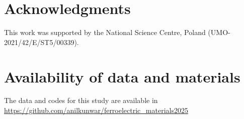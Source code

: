\documentclass[a4paper,fleqn]{cas-sc}
\begin{document}
\section*{Acknowledgments}
 This work was supported by the National Science Centre, Poland (UMO-2021/42/E/ST5/00339). 
 
 
\section*{Availability of data and materials}
The data and codes for this study are available in \url{https://github.com/anilkunwar/ferroelectric_materials2025}












\end{document}
